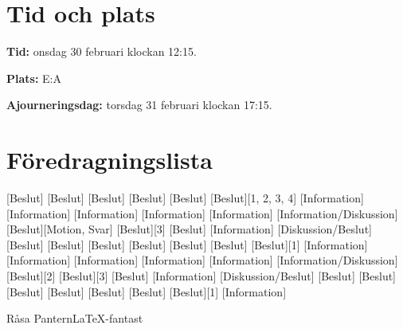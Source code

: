 \documentclass{dseknotice}
\begin{document}
\setdate{\today}

\maketitle
\section*{Tid och plats}
\textbf{Tid:} onsdag 30 februari klockan 12:15.

\textbf{Plats:} E:A

\textbf{Ajourneringsdag:} torsdag 31 februari klockan 17:15.

\section*{Föredragningslista}
\begin{agenda}
    [Beslut]
    [Beslut]
    [Beslut]
    [Beslut]
    [Beslut]
    [Beslut][1, 2, 3, 4]
    [Information]
    [Information]
    [Information]
    [Information]
    [Information]
    [Information/Diskussion]
    [Beslut][Motion, Svar]
    [Beslut][3]
    [Beslut]
    [Information]
    [Diskussion/Beslut]
    [Beslut]
    [Beslut]
    [Beslut]
    [Beslut]
    [Beslut]
    [Beslut]
    [Beslut][1]
    [Information]
    [Information]
    [Information]
    [Information]
    [Information]
    [Information/Diskussion]
    [Beslut][2]
    [Beslut][3]
    [Beslut]
    [Information]
    [Diskussion/Beslut]
    [Beslut]
    [Beslut]
    [Beslut]
    [Beslut]
    [Beslut]
    [Beslut]
    [Beslut][1]
    [Information]
\end{agenda}

\medskip

\signature{För D-sektionen, dag som ovan}{Råsa Pantern}{\LaTeX-fantast}
\end{document}

